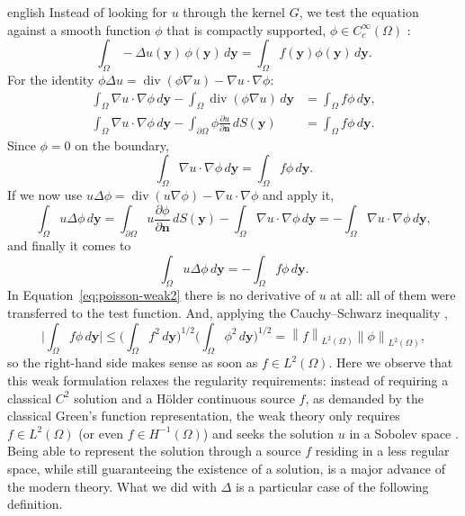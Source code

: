 \documentclass[12pt,letterpaper,twoside]{book}
\newcommand{\norm}[1]{\left\lVert #1 \right\rVert}
\begin{document}
\begin{hyphenrules}{english}
Instead of looking for $u$ through the kernel $G$, we test the equation against a smooth function
$\phi$ that is compactly supported, $\phi\in C_c^\infty(\Omega)$ \cite{reyna_sobolev}:
\begin{equation}
  \int_\Omega-\Delta u(\mathbf{y})\,\phi(\mathbf{y})\,d\mathbf{y}=\int_\Omega f(\mathbf{y})\phi(\mathbf{y})\,d\mathbf{y}.
  \label{eq:poisson-tested}
\end{equation}
For the identity $\phi\Delta u=\operatorname{div}(\phi\nabla u)-\nabla u\cdot\nabla\phi$:
\begin{align*}
  \int_\Omega\nabla u\cdot\nabla\phi\,d\mathbf{y}-\int_\Omega\operatorname{div}(\phi\nabla u)\,d\mathbf{y}
    &=\int_\Omega f\phi\,d\mathbf{y},\\
  \int_\Omega\nabla u\cdot\nabla\phi\,d\mathbf{y}-\int_{\partial\Omega}\phi\frac{\partial u}{\partial\mathbf{n}}\,d S(\mathbf{y})
    &=\int_\Omega f\phi\,d\mathbf{y}.
\end{align*}
Since $\phi=0$ on the boundary,
\begin{equation}
  \int_\Omega\nabla u\cdot\nabla\phi\,d\mathbf{y}=\int_\Omega f\phi\,d\mathbf{y}.
  \label{eq:poisson-weak1}
\end{equation}
If we now use $u\Delta\phi=\operatorname{div}(u\nabla\phi)-\nabla u\cdot\nabla\phi$ and apply it,
\[
  \int_\Omega u\Delta\phi\,d\mathbf{y}=\int_{\partial\Omega}u\frac{\partial\phi}{\partial\mathbf{n}}\,d S(\mathbf{y})
  -\int_\Omega\nabla u\cdot\nabla\phi\,d\mathbf{y}=-\int_\Omega\nabla u\cdot\nabla\phi\,d\mathbf{y},
\]
and finally it comes to
\begin{equation}
  \int_\Omega u\Delta\phi\,d\mathbf{y}=-\int_\Omega f\phi\,d\mathbf{y}.
  \label{eq:poisson-weak2}
\end{equation}
In Equation~\eqref{eq:poisson-weak2} there is no derivative of $u$ at all: all of them were transferred to the
test function. And, applying the Cauchy--Schwarz inequality \cite{castillo2014},
\begin{equation}
  \Big|\int_\Omega f\phi\,d\mathbf{y}\Big|\le\Big(\int_\Omega f^2\,d\mathbf{y}\Big)^{1/2}\Big(\int_\Omega\phi^2\,d\mathbf{y}\Big)^{1/2}
  =\norm{f}_{L^2(\Omega)}\norm{\phi}_{L^2(\Omega)},
  \label{eq:cauchy-schwarz}
\end{equation}
so the right-hand side makes sense as soon as $f\in L^2(\Omega)$. Here we observe that this weak
formulation relaxes the regularity requirements: instead of requiring a classical $C^2$ solution and a
Hölder continuous source $f$, as demanded by the classical Green's function representation, the weak
theory only requires $f\in L^2(\Omega)$ (or even $f\in H^{-1}(\Omega)$) and seeks the solution $u$ in a
Sobolev space \cite{castillo2014}. Being able to represent the solution through a source $f$
residing in a less regular space, while still guaranteeing the existence of a solution, is a major
advance of the modern theory. What we did with $\Delta$ is a particular case of the following
definition.


\end{hyphenrules}
\end{document}
